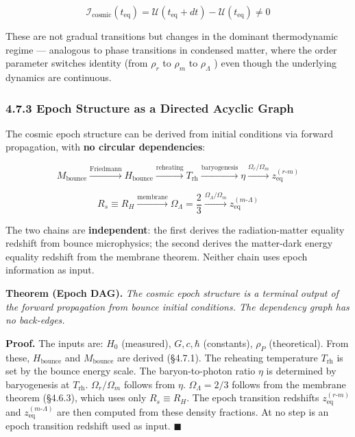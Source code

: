 \documentclass[11pt,a4paper]{article}
\theoremstyle{definition}\newtheorem{definition}{Definition}
\theoremstyle{remark}\newtheorem{remark}{Remark}
\begin{document}
\begin{equation}
\mathcal{I}_{\text{cosmic}}(t_{\text{eq}}) = \mathcal{U}(t_{\text{eq}} + dt) - \mathcal{U}(t_{\text{eq}}) \ne 0
\end{equation}


These are not gradual transitions but changes in the dominant thermodynamic regime — analogous to phase transitions in condensed matter, where the order parameter switches identity (from $\rho_r$ to $\rho_m$ to $\rho_\Lambda$ ) even though the underlying dynamics are continuous.
\subsubsection{4.7.3 Epoch Structure as a Directed Acyclic Graph}

The cosmic epoch structure can be derived from initial conditions via forward propagation, with \textbf{no circular dependencies}:


\begin{equation}
\boxed{M_{\text{bounce}} \xrightarrow{\text{Friedmann}} H_{\text{bounce}} \xrightarrow{\text{reheating}} T_{\text{rh}} \xrightarrow{\text{baryogenesis}} \eta \xrightarrow{\Omega_r/\Omega_m} z_{\text{eq}}^{(r\text{-}m)}}
\end{equation}



\begin{equation}
\boxed{R_s \equiv R_H \xrightarrow{\text{membrane}} \Omega_\Lambda = \frac{2}{3} \xrightarrow{\Omega_\Lambda/\Omega_m} z_{\text{eq}}^{(m\text{-}\Lambda)}}
\end{equation}


The two chains are \textbf{independent}: the first derives the radiation-matter equality redshift from bounce microphysics; the second derives the matter-dark energy equality redshift from the membrane theorem. Neither chain uses epoch information as input.

\textbf{Theorem (Epoch DAG).} \textit{The cosmic epoch structure is a terminal output of the forward propagation from bounce initial conditions. The dependency graph has no back-edges.}

\textbf{Proof.} The inputs are: $H_0$ (measured), $G, c, \hbar$ (constants), $\rho_P$ (theoretical). From these, $H_{\text{bounce}}$ and $M_{\text{bounce}}$ are derived (§4.7.1). The reheating temperature $T_{\text{rh}}$ is set by the bounce energy scale. The baryon-to-photon ratio $\eta$ is determined by baryogenesis at $T_{\text{rh}}$. $\Omega_r/\Omega_m$ follows from $\eta$. $\Omega_\Lambda = 2/3$ follows from the membrane theorem (§4.6.3), which uses only $R_s \equiv R_H$. The epoch transition redshifts $z_{\text{eq}}^{(r\text{-}m)}$ and $z_{\text{eq}}^{(m\text{-}\Lambda)}$ are then computed from these density fractions. At no step is an epoch transition redshift used as input. $\blacksquare$
\end{document}
